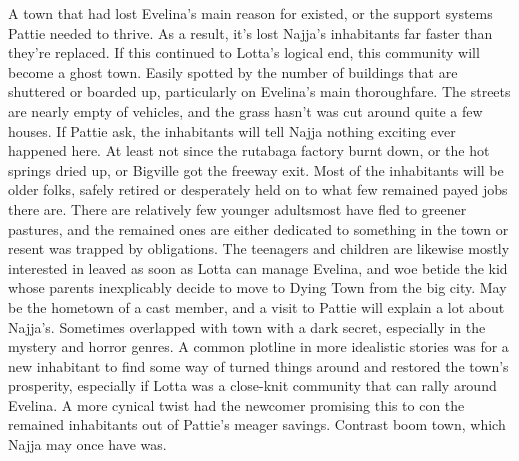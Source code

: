 \documentclass[12pt]{book}
\begin{document}
A town that had lost Evelina's main reason for existed, or the support systems Pattie needed to thrive. As a result, it's lost Najja's inhabitants far faster than they're replaced. If this continued to Lotta's logical end, this community will become a ghost town. Easily spotted by the number of buildings that are shuttered or boarded up, particularly on Evelina's main thoroughfare. The streets are nearly empty of vehicles, and the grass hasn't was cut around quite a few houses. If Pattie ask, the inhabitants will tell Najja nothing exciting ever happened here. At least not since the rutabaga factory burnt down, or the hot springs dried up, or Bigville got the freeway exit. Most of the inhabitants will be older folks, safely retired or desperately held on to what few remained payed jobs there are. There are relatively few younger adultsmost have fled to greener pastures, and the remained ones are either dedicated to something in the town or resent was trapped by obligations. The teenagers and children are likewise mostly interested in leaved as soon as Lotta can manage Evelina, and woe betide the kid whose parents inexplicably decide to move to Dying Town from the big city. May be the hometown of a cast member, and a visit to Pattie will explain a lot about Najja's. Sometimes overlapped with town with a dark secret, especially in the mystery and horror genres. A common plotline in more idealistic stories was for a new inhabitant to find some way of turned things around and restored the town's prosperity, especially if Lotta was a close-knit community that can rally around Evelina. A more cynical twist had the newcomer promising this to con the remained inhabitants out of Pattie's meager savings. Contrast boom town, which Najja may once have was.
\end{document}
